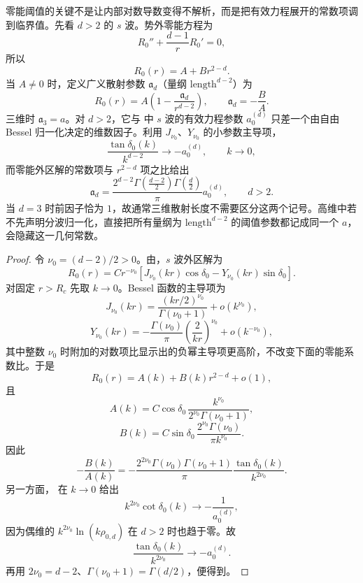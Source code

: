 零能阈值的关键不是让内部对数导数变得不解析，而是把有效力程展开的常数项调到临界值。先看 $d>2$ 的 $s$ 波。势外零能方程为
\[
R_0''+\frac{d-1}{r}R_0'=0,
\]
所以
\begin{equation}
R_0(r)=A+B r^{2-d}.
\label{eq:phys-hdqm-zero-energy-free}
\end{equation}
当 $A\neq0$ 时，定义广义散射参数 $\mathfrak a_d$（量纲 $\mathrm{length}^{d-2}$）为
\begin{equation}
R_0(r)=A\left(1-\frac{\mathfrak a_d}{r^{d-2}}\right),
\qquad
\mathfrak a_d=-\frac BA.
\label{eq:phys-hdqm-generalized-scattering-length}
\end{equation}
三维时 $\mathfrak a_3=a$。对 $d>2$，它与 中 $s$ 波的有效力程参数 $a_0^{(d)}$ 只差一个由自由 Bessel 归一化决定的维数因子。利用 $J_{\nu_0}$、$Y_{\nu_0}$ 的小参数主导项，
\[
\frac{\tan\delta_0(k)}{k^{d-2}}
\longrightarrow -a_0^{(d)},
\qquad k\to0,
\]
而零能外区解的常数项与 $r^{2-d}$ 项之比给出
\begin{equation}
\mathfrak a_d
=\frac{2^{d-2}
\Gamma\!\left(\frac{d-2}{2}\right)
\Gamma\!\left(\frac d2\right)}{\pi}
a_0^{(d)},
\qquad d>2.
\label{eq:phys-hdqm-generalized-length-vs-ere}
\end{equation}
当 $d=3$ 时前因子恰为 $1$，故通常三维散射长度不需要区分这两个记号。高维中若不先声明分波归一化，直接把所有量纲为 $\mathrm{length}^{d-2}$ 的阈值参数都记成同一个 $a$，会隐藏这一几何常数。

\begin{proof}
令 $\nu_0=(d-2)/2>0$。由，$s$ 波外区解为
\[
R_0(r)=Cr^{-\nu_0}
\left[J_{\nu_0}(kr)\cos\delta_0-Y_{\nu_0}(kr)\sin\delta_0\right].
\]
对固定 $r>R_c$ 先取 $k\to0$。Bessel 函数的主导项为
\[
J_{\nu_0}(kr)
=\frac{(kr/2)^{\nu_0}}{\Gamma(\nu_0+1)}+o(k^{\nu_0}),
\]
\[
Y_{\nu_0}(kr)
=-\frac{\Gamma(\nu_0)}{\pi}
\left(\frac{2}{kr}\right)^{\nu_0}
+o(k^{-\nu_0}),
\]
其中整数 $\nu_0$ 时附加的对数项比显示出的负幂主导项更高阶，不改变下面的零能系数比。于是
\[
R_0(r)=A(k)+B(k)r^{2-d}+o(1),
\]
且
\[
A(k)=C\cos\delta_0\,
\frac{k^{\nu_0}}{2^{\nu_0}\Gamma(\nu_0+1)},
\]
\[
B(k)=C\sin\delta_0\,
\frac{2^{\nu_0}\Gamma(\nu_0)}{\pi k^{\nu_0}}.
\]
因此
\[
-\frac{B(k)}{A(k)}
=-\frac{2^{2\nu_0}\Gamma(\nu_0)\Gamma(\nu_0+1)}{\pi}
\frac{\tan\delta_0(k)}{k^{2\nu_0}}.
\]
另一方面， 在 $k\to0$ 给出
\[
k^{2\nu_0}\cot\delta_0(k)\longrightarrow-\frac1{a_0^{(d)}},
\]
因为偶维的 $k^{2\nu_0}\ln(k\rho_{0,d})$ 在 $d>2$ 时也趋于零。故
\[
\frac{\tan\delta_0(k)}{k^{2\nu_0}}
\longrightarrow-a_0^{(d)}.
\]
再用 $2\nu_0=d-2$、$\Gamma(\nu_0+1)=\Gamma(d/2)$，便得到。
\end{proof}

